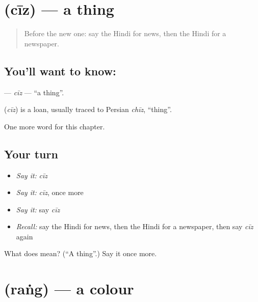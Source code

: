 \section[\texorpdfstring{\hi{चीज़} (cīz)}{चीज़ (cīz)}]{ (cīz) — a thing}

\label{lesson:HI-C190-ciz}



\begin{quote}
Before the new one: say the Hindi for news, then the Hindi for a newspaper.
\end{quote}

\subsection*{You'll want to know: }
\textbf{} — \emph{cīz} — \textquotedblleft{}a thing\textquotedblright{}.

\begin{cousinweb}
\textbf{} (\emph{cīz}) is a loan, usually traced to Persian \emph{chīz}, \textquotedblleft{}thing\textquotedblright{}.
\end{cousinweb}

\begin{grammarlens}[title={What you've built}]
One more word for this chapter.
\end{grammarlens}

\subsection*{Your turn}
\begin{itemize}
\raggedright
  \item \emph{Say it:} \emph{cīz}
  \item \emph{Say it:} \emph{cīz}, once more
  \item \emph{Say it:} say \emph{cīz}
  \item \emph{Recall:} say the Hindi for news, then the Hindi for a newspaper, then say \emph{cīz} again
\end{itemize}

\begin{tcolorbox}[breakable,colback=teal!4,colframe=teal!35!black,title={Before you move on}]
What does  mean? (\textquotedblleft{}A thing\textquotedblright{}.) Say it once more.
\end{tcolorbox}
\section[\texorpdfstring{\hi{रंग} (raṅg)}{रंग (raṅg)}]{ (raṅg) — a colour}


